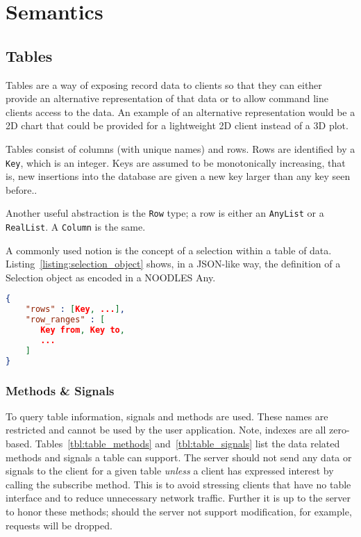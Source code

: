 \documentclass[11pt, oneside]{amsart}
\begin{document}
\section{Semantics}


\subsection{Tables}

Tables are a way of exposing record data to clients so that they can either provide an alternative representation of that data or to allow command line clients access to the data. An example of an alternative representation would be a 2D chart that could be provided for a lightweight 2D client instead of a 3D plot.

Tables consist of columns (with unique names) and rows. Rows are identified by a \texttt{Key}, which is an integer. Keys are assumed to be monotonically increasing, that is, new insertions into the database are given a new key larger than any key seen before..

Another useful abstraction is the \texttt{Row} type; a row is either an \texttt{AnyList} or a \texttt{RealList}. A \texttt{Column} is the same.

A commonly used notion is the concept of a selection within a table of data. Listing~\ref{listing:selection_object} shows, in a JSON-like way, the definition of a Selection object as encoded in a NOODLES Any.

\begin{lstlisting}[language=json, label=listing:selection_object, caption=Selection object definition. Note that the \texttt{to} field in the row ranges is exclusive. The \texttt{row\_ranges} list \textit{must} have an even number of elements. ]
{
	"rows" : [Key, ...],
	"row_ranges" : [
	   Key from, Key to,
	   ...
	]
}
\end{lstlisting}

\subsubsection{Methods \& Signals}

To query table information, signals and methods are used. These names are restricted and cannot be used by the user application. Note, indexes are all zero-based. Tables~\ref{tbl:table_methods} and~\ref{tbl:table_signals} list the data related methods and signals a table can support. The server should not send any data or signals to the client for a given table \emph{unless} a client has expressed interest by calling the subscribe method. This is to avoid stressing clients that have no table interface and to reduce unnecessary network traffic. Further it is up to the server to honor these methods; should the server not support modification, for example, requests will be dropped.
\end{document}
